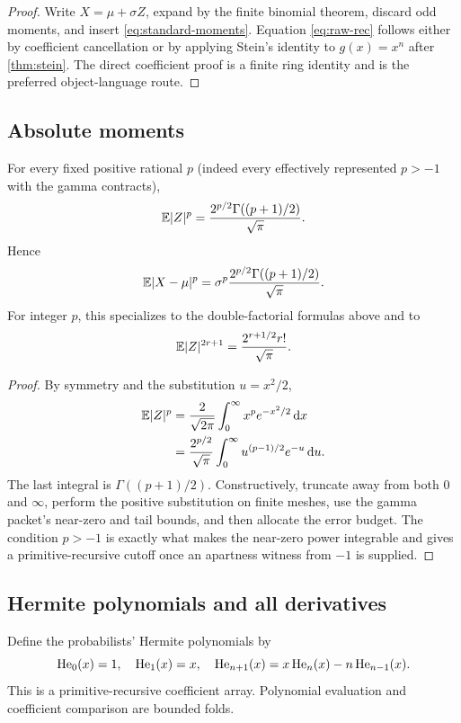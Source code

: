 \begin{proof}
Write $X=\mu+\sigma Z$, expand by the finite binomial theorem, discard odd moments, and insert \eqref{eq:standard-moments}.  Equation \eqref{eq:raw-rec} follows either by coefficient cancellation or by applying Stein's identity to $g(x)=x^n$ after \cref{thm:stein}.  The direct coefficient proof is a finite ring identity and is the preferred object-language route.
\end{proof}

\subsection{Absolute moments}

\begin{theorem}\label{thm:absolute-moments}
For every fixed positive rational $p$ (indeed every effectively represented $p>-1$ with the gamma contracts),
\begin{equation}\label{eq:absolute-moment}
 \mathbb E|Z|^p=\frac{2^{p/2}\Gamma((p+1)/2)}{\sqrt\pi}.
\end{equation}
Hence
\[
 \mathbb E|X-\mu|^p=\sigma^p\frac{2^{p/2}\Gamma((p+1)/2)}{\sqrt\pi}.
\]
For integer $p$, this specializes to the double-factorial formulas above and to
\[
 \mathbb E|Z|^{2r+1}=\frac{2^{r+1/2}r!}{\sqrt\pi}.
\]
\end{theorem}

\begin{proof}
By symmetry and the substitution $u=x^2/2$,
\begin{align*}
 \mathbb E|Z|^p
 &=\frac2{\sqrt{2\pi}}\int_0^\infty x^p e^{-x^2/2}\,\mathrm d x\\
 &=\frac{2^{p/2}}{\sqrt\pi}\int_0^\infty
      u^{(p-1)/2}e^{-u}\,\mathrm d u.
\end{align*}
The last integral is $\Gamma((p+1)/2)$.  Constructively, truncate away from both $0$ and $\infty$, perform the positive substitution on finite meshes, use the gamma packet's near-zero and tail bounds, and then allocate the error budget.  The condition $p>-1$ is exactly what makes the near-zero power integrable and gives a primitive-recursive cutoff once an apartness witness from $-1$ is supplied.
\end{proof}

\subsection{Hermite polynomials and all derivatives}

Define the probabilists' Hermite polynomials by
\begin{equation}\label{eq:hermite-def}
 \operatorname{He}_0(x)=1,
 \quad \operatorname{He}_1(x)=x,
 \quad \operatorname{He}_{n+1}(x)=x\operatorname{He}_n(x)-n\operatorname{He}_{n-1}(x).
\end{equation}
This is a primitive-recursive coefficient array.  Polynomial evaluation and coefficient comparison are bounded folds.


